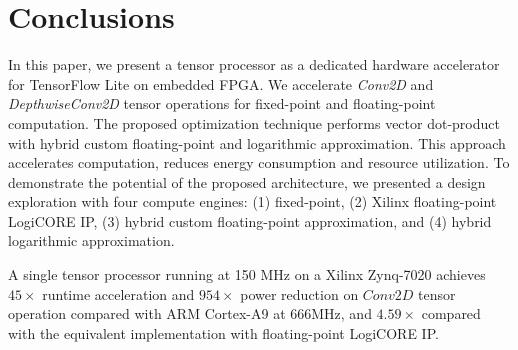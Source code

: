 \section{Conclusions}
\label{sec:conclusions}

In this paper, we present a tensor processor as a dedicated hardware accelerator for TensorFlow Lite on embedded FPGA. We accelerate \emph{Conv2D} and \emph{DepthwiseConv2D} tensor operations for fixed-point and floating-point computation. The proposed optimization technique performs vector dot-product with hybrid custom floating-point and logarithmic approximation. This approach accelerates computation, reduces energy consumption and resource utilization. To demonstrate the potential of the proposed architecture, we presented a design exploration with four compute engines: (1) fixed-point, (2) Xilinx floating-point LogiCORE IP, (3) hybrid custom floating-point approximation, and (4) hybrid logarithmic approximation.

A single tensor processor running at 150 MHz on a Xilinx Zynq-7020 achieves $45\times$ runtime acceleration and $954\times$ power reduction on $Conv2D$ tensor operation compared with ARM Cortex-A9 at 666MHz, and $4.59\times$ compared with the equivalent implementation with floating-point LogiCORE IP.